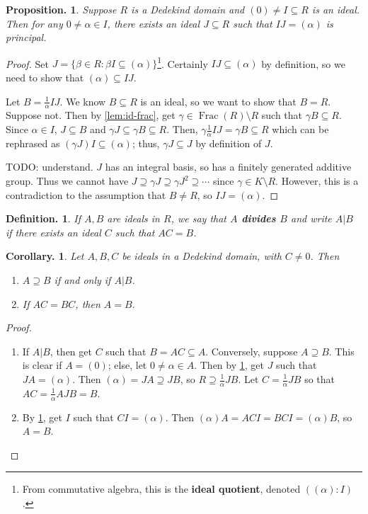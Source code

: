 \documentclass[11pt, a4paper]{memoir}
\theoremstyle{change}
\newtheorem{corollary}[theorem]{Corollary.}
\newtheorem{proposition}[theorem]{Proposition.}
\theoremstyle{plain}
\theoremstyle{nonumberplain}
\newtheorem{definition}{Definition.}
\newtheorem{proof}{Proof}
\DeclareMathOperator{\Frac}{Frac}
\newcommand{\mbf}[1]{{\boldmath\bfseries #1}}
\numberwithin{equation}{section}
\begin{document}
\begin{proposition}\label{prop:id-inv}
    Suppose $R$ is a Dedekind domain and $(0)\neq I\subseteq R$ is an ideal.
    Then for any $0\neq \alpha\in I$, there exists an ideal $J\subseteq R$ such that $IJ=(\alpha)$ is principal.
\end{proposition}
\begin{proof}
    Set $J=\{\beta\in R:\beta I\subseteq(\alpha)\}$\footnote{From commutative algebra, this is the \textbf{ideal quotient}, denoted $((\alpha):I)$.}.
    Certainly $IJ\subseteq(\alpha)$ by definition, so we need to show that $(\alpha)\subseteq IJ$.

    Let $B=\frac{1}{\alpha}IJ$.
    We know $B\subseteq R$ is an ideal, so we want to show that $B=R$.
    Suppose not.
    Then by \cref{lem:id-frac}, get $\gamma\in \Frac(R)\setminus R$ such that $\gamma B\subseteq R$.
    Since $\alpha\in I$, $J\subseteq B$ and $\gamma J\subseteq\gamma B\subseteq R$.
    Then, $\gamma\frac{1}{\alpha} IJ=\gamma B\subseteq R$ which can be rephrased as $(\gamma J)I\subseteq(\alpha)$; thus, $\gamma J\subseteq J$ by definition of $J$.

    TODO: understand.
    $J$ has an integral basis, so has a finitely generated additive group.
    Thus we cannot have $J\supseteq\gamma J\supseteq\gamma J^2\supseteq\cdots$ since $\gamma\in K\setminus R$.
    However, this is a contradiction to the assumption that $B\neq R$, so $IJ=(\alpha)$.
\end{proof}
\begin{definition}
    If $A,B$ are ideals in $R$, we say that \mbf{$A$ divides $B$} and write $A|B$ if there exists an ideal $C$ such that $AC=B$.
\end{definition}
\begin{corollary}
    Let $A,B,C$ be ideals in a Dedekind domain, with $C\neq 0$.
    Then
    \begin{enumerate}[nolistsep,label=(\roman*)]
        \item $A\supseteq B$ if and only if $A|B$.
        \item If $AC=BC$, then $A=B$.
    \end{enumerate}
\end{corollary}
\begin{proof}
    \begin{enumerate}[label=(\roman*)]
        \item If $A|B$, then get $C$ such that $B=AC\subseteq A$.
            Conversely, suppose $A\supseteq B$.
            This is clear if $A=(0)$; else, let $0\neq\alpha\in A$.
            Then by \cref{prop:id-inv}, get $J$ such that $JA=(\alpha)$.
            Then $(\alpha)=JA\supseteq JB$, so $R\supseteq\frac{1}{\alpha}JB$.
            Let $C=\frac{1}{\alpha}JB$ so that $AC=\frac{1}{\alpha}AJB=B$.
        \item By \cref{prop:id-inv}, get $I$ such that $CI=(\alpha)$.
            Then $(\alpha)A=ACI=BCI=(\alpha)B$, so $A=B$.
    \end{enumerate}
\end{proof}
\end{document}

